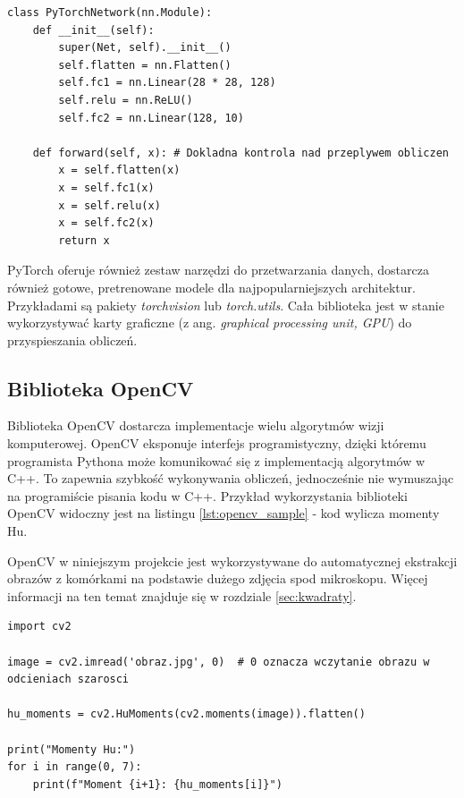 \begin{lstlisting}[language=ipython,caption={Przykładowa sieć neuronowa w PyTorch},label={lst:pytorch_sample}]
class PyTorchNetwork(nn.Module):
    def __init__(self):
        super(Net, self).__init__()
        self.flatten = nn.Flatten()
        self.fc1 = nn.Linear(28 * 28, 128)
        self.relu = nn.ReLU()
        self.fc2 = nn.Linear(128, 10)

    def forward(self, x): # Dokladna kontrola nad przeplywem obliczen
        x = self.flatten(x)
        x = self.fc1(x)
        x = self.relu(x)
        x = self.fc2(x)
        return x
\end{lstlisting}

PyTorch oferuje również zestaw narzędzi do przetwarzania danych, dostarcza również gotowe, pretrenowane modele dla najpopularniejszych architektur.
Przykładami są pakiety \textit{torchvision} lub \textit{torch.utils}. Cała biblioteka jest w stanie wykorzystywać karty graficzne (z ang. \textit{graphical processing unit, GPU}) do przyspieszania obliczeń.

\subsection{Biblioteka OpenCV}

Biblioteka OpenCV \cite{opencv} dostarcza implementacje wielu algorytmów wizji komputerowej.
OpenCV eksponuje interfejs programistyczny, dzięki któremu programista Pythona może komunikować się z implementacją algorytmów w C++.
To zapewnia szybkość wykonywania obliczeń, jednocześnie nie wymuszając na programiście pisania kodu w C++. Przykład wykorzystania biblioteki OpenCV widoczny jest na listingu \ref{lst:opencv_sample}
- kod wylicza momenty Hu.

OpenCV w niniejszym projekcie jest wykorzystywane do automatycznej ekstrakcji obrazów z komórkami na podstawie dużego zdjęcia spod mikroskopu.
Więcej informacji na ten temat znajduje się w rozdziale \ref{sec:kwadraty}.

\begin{lstlisting}[language=ipython,caption={Obliczenie momentów Hu z użyciem OpenCV}, label={lst:opencv_sample}]
import cv2

image = cv2.imread('obraz.jpg', 0)  # 0 oznacza wczytanie obrazu w odcieniach szarosci

hu_moments = cv2.HuMoments(cv2.moments(image)).flatten()

print("Momenty Hu:")
for i in range(0, 7):
    print(f"Moment {i+1}: {hu_moments[i]}")
\end{lstlisting}

